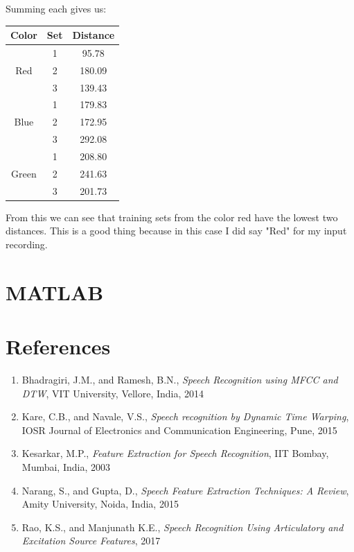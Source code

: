 \documentclass{article}
\begin{document}
Summing each gives us:
\begin{center}
    \begin{tabular}{c c c}
    \hline
    Color & Set & Distance \\
    \hline
    \multirow{3}{4em}{Red} & 1 & 95.78 \\
    & 2 & 180.09\\
    & 3 & 139.43\\
    \hline
    \multirow{3}{4em}{Blue} & 1 & 179.83 \\
    & 2 & 172.95\\
    & 3 & 292.08\\
    \hline
    \multirow{3}{4em}{Green} & 1 & 208.80 \\
    & 2 & 241.63\\
    & 3 & 201.73\\
    \hline
    \end{tabular}
\end{center}

From this we can see that training sets from the color red have the lowest two distances. This is a good thing because in this case I did say "Red" for my input recording.

\appendix
\section{MATLAB}


\newpage
\section*{References}
\begin{enumerate}
    \item Bhadragiri, J.M., and Ramesh, B.N., \emph{Speech Recognition using MFCC and DTW}, VIT University, Vellore, India, 2014
    \item Kare, C.B., and Navale, V.S., \emph{Speech recognition by Dynamic Time Warping}, IOSR Journal of Electronics and Communication Engineering, Pune, 2015
    \item Kesarkar, M.P., \emph{Feature Extraction for Speech Recognition}, IIT Bombay, Mumbai, India, 2003
    \item Narang, S., and Gupta, D., \emph{Speech Feature Extraction Techniques: A Review}, Amity University, Noida, India, 2015
    \item Rao, K.S., and Manjunath K.E., \emph{Speech Recognition Using Articulatory and Excitation Source Features}, 2017
\end{enumerate}
\end{document}
